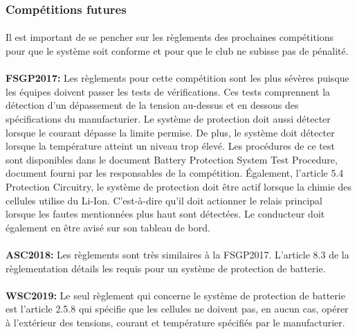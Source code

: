 	\subsubsection{Compétitions futures}
	
		\paragraph{}
		Il est important de se pencher sur les règlements des prochaines compétitions pour que le système soit conforme et pour que le club ne subisse pas de pénalité.
	
		\paragraph{}   \textbf{FSGP2017:}
		Les règlements pour cette compétition sont les plus sévères puisque les équipes doivent passer les tests de vérifications. Ces tests comprennent la détection d'un dépassement de la tension au-dessus et en dessous des spécifications du manufacturier. Le système de protection doit aussi détecter lorsque le courant dépasse la limite permise. De plus, le système doit détecter lorsque la température atteint un niveau trop élevé. Les procédures de ce test sont disponibles dans le document Battery Protection System Test Procedure, document fourni par les responsables de la compétition. Également, l'article 5.4 Protection Circuitry, le système de protection doit être actif lorsque la chimie des cellules utilise du Li-Ion. C'est-à-dire qu'il doit actionner le relais principal lorsque les fautes mentionnées plus haut sont détectées. Le conducteur doit également en être avisé sur son tableau de bord. \cite{reg_fsgp2017}
		
		\paragraph{}   \textbf{ASC2018:}
		Les règlements sont très similaires à la FSGP2017. L'article 8.3 de la règlementation détails les requis pour un système de protection de batterie. \cite{reg_asc2018}
		
		\paragraph{}   \textbf{WSC2019:}
		Le seul règlement qui concerne le système de protection de batterie est l'article 2.5.8 qui spécifie que les cellules ne doivent pas, en aucun cas, opérer à l'extérieur des tensions, courant et température spécifiés par le manufacturier. \cite{reg_wsc2017}
